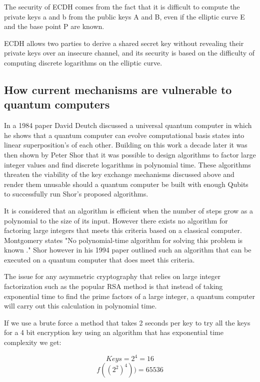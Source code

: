 \documentclass{article}
\begin{document}
The security of ECDH comes from the fact that it is difficult to compute the private keys a and b from the public keys A and B, even if the elliptic curve E and the base point P are known.

ECDH allows two parties to derive a shared secret key without revealing their private keys over an insecure channel, and its security is based on the difficulty of computing discrete logarithms on the elliptic curve.

\subsection{How current mechanisms are vulnerable to quantum computers}
In a 1984 paper David Deutch \cite{Deutsch1985QuantumComputer} discussed a universal quantum computer in which he shows that a quantum computer can evolve computational basis states into linear superposition's of each other. Building on this work a decade later it was then shown by Peter Shor \cite{Shor1994AlgorithmsFactoring} that it was possible to design algorithms to factor large integer values and find discrete logarithms in polynomial time. These algorithms threaten the viability of the key exchange mechanisms discussed above and render them unusable should a quantum computer be built with enough Qubits to successfully run Shor's proposed algorithms.

It is considered that an algorithm is efficient when the number of steps grow as a polynomial to the size of its input. \cite{Shor1994AlgorithmsFactoring}  However there exists no algorithm for factoring large integers that meets this criteria based on a classical computer. Montgomery \cite{Montgomery1994AAlgorithms} states "No polynomial-time algorithm for solving this problem is known ."  Shor however in his 1994 paper  outlined  \cite{Shor1994AlgorithmsFactoring} such an algorithm that can be executed on a quantum computer that does meet this criteria. 

The issue for any asymmetric cryptography that relies on large integer factorization such as the popular RSA method is that instead of taking exponential time to find the prime factors of a large integer, a quantum computer will carry out this calculation in polynomial time. 

If we use a brute force a method that takes 2 seconds per key to try all the keys for a 4 bit encryption key using an algorithm that has exponential time complexity we get:

\[Keys = 2^4 = 16\]
\[f((2^2)^4)) = 65536\]
\end{document}
